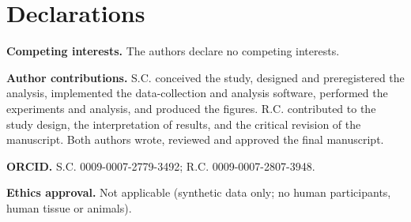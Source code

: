 \documentclass[lineno,pdflatex,sn-basic,Numbered]{sn-jnl}
\begin{document}
\section*{Declarations}

\textbf{Competing interests.} The authors declare no competing interests.

\textbf{Author contributions.} S.C. conceived the study, designed and preregistered the analysis, implemented the data-collection and analysis software, performed the experiments and analysis, and produced the figures. R.C. contributed to the study design, the interpretation of results, and the critical revision of the manuscript. Both authors wrote, reviewed and approved the final manuscript.

\textbf{ORCID.} S.C. 0009-0007-2779-3492; R.C. 0009-0007-2807-3948.

\textbf{Ethics approval.} Not applicable (synthetic data only; no human participants, human tissue or animals).


\end{document}
